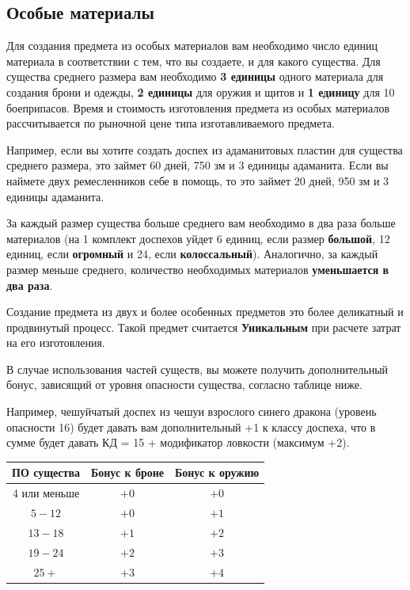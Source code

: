 \documentclass[a4paper, 9pt, twocolumn]{book}
\begin{document}
	\subsection{Особые материалы}
	
	Для создания предмета из особых материалов вам необходимо число единиц материала в соответствии с тем, что вы создаете, и для какого существа. Для существа среднего размера вам необходимо \textbf{3 единицы} одного материала для создания брони и одежды, \textbf{2 единицы} для оружия и щитов и \textbf{1 единицу} для 10 боеприпасов. Время и стоимость изготовления предмета из особых материалов рассчитывается по рыночной цене типа изготавливаемого предмета.
	
	Например, если вы хотите создать доспех из адаманитовых пластин для существа среднего размера, это займет 60 дней, 750 зм и 3 единицы адаманита. Если вы наймете двух ремесленников себе в помощь, то это займет 20 дней, 950 зм и 3 единицы адаманита.
	
	За каждый размер существа больше среднего вам необходимо в два раза больше материалов (на 1 комплект доспехов уйдет 6 единиц, если размер \textbf{большой}, 12 единиц, если \textbf{огромный} и 24, если \textbf{колоссальный}). Аналогично, за каждый размер меньше среднего, количество необходимых материалов \textbf{уменьшается в два раза}.
	
	Создание предмета из двух и более особенных предметов это более деликатный и продвинутый процесс. Такой предмет считается \textbf{Уникальным} при расчете затрат на его изготовления.
	
	В случае использования частей существ, вы можете получить дополнительный бонус, зависящий от уровня опасности существа, согласно таблице ниже.
	
	Например, чешуйчатый доспех из чешуи взрослого синего дракона (уровень опасности 16) будет давать вам дополнительный +1 к классу доспеха, что в сумме будет давать КД = 15 + модификатор ловкости (максимум +2).
	
	\begin{tabular}{|c|c|c|}
		\hline
		\textbf{ПО существа} & \textbf{Бонус к броне} & \textbf{Бонус к оружию} \\
		\hline
		4 или меньше & $+0$ & $+0$ \\
		\hline
		$5 - 12$ & $+0$ & $+1$ \\
		\hline
		$13 - 18$ & $+1$ & $+2$ \\
		\hline
		$19 - 24$ & $+2$ & $+3$ \\
		\hline
		$25 + $ & $+3$ & $+4$ \\
		\hline
	\end{tabular}
	
\end{document}
